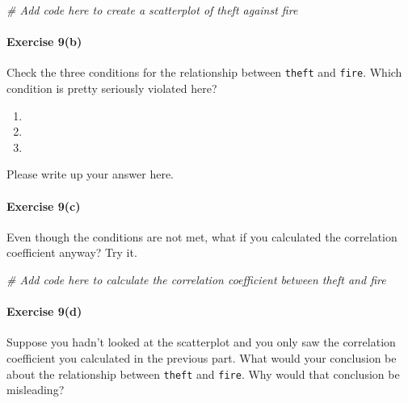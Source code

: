 \documentclass[
]{book}
\newenvironment{Shaded}{\begin{snugshade}}{\end{snugshade}}
\newcommand{\CommentTok}[1]{\textcolor[rgb]{0.56,0.35,0.01}{\textit{#1}}}
\providecommand{\tightlist}{%
  \setlength{\itemsep}{0pt}\setlength{\parskip}{0pt}}
\begin{document}
\begin{Shaded}
\begin{Highlighting}[]
\CommentTok{\# Add code here to create a scatterplot of theft against fire}
\end{Highlighting}
\end{Shaded}

\hypertarget{exercise-9b-2}{%
\paragraph*{Exercise 9(b)}\label{exercise-9b-2}}

Check the three conditions for the relationship between \texttt{theft} and \texttt{fire}. Which condition is pretty seriously violated here?

\begin{enumerate}
\def\labelenumi{\arabic{enumi}.}
\tightlist
\item
\item
\item
\end{enumerate}

Please write up your answer here.

\hypertarget{exercise-9c}{%
\paragraph*{Exercise 9(c)}\label{exercise-9c}}

Even though the conditions are not met, what if you calculated the correlation coefficient anyway? Try it.

\begin{Shaded}
\begin{Highlighting}[]
\CommentTok{\# Add code here to calculate the correlation coefficient between theft and fire}
\end{Highlighting}
\end{Shaded}

\hypertarget{exercise-9d}{%
\paragraph*{Exercise 9(d)}\label{exercise-9d}}

Suppose you hadn't looked at the scatterplot and you only saw the correlation coefficient you calculated in the previous part. What would your conclusion be about the relationship between \texttt{theft} and \texttt{fire}. Why would that conclusion be misleading?
\end{document}
